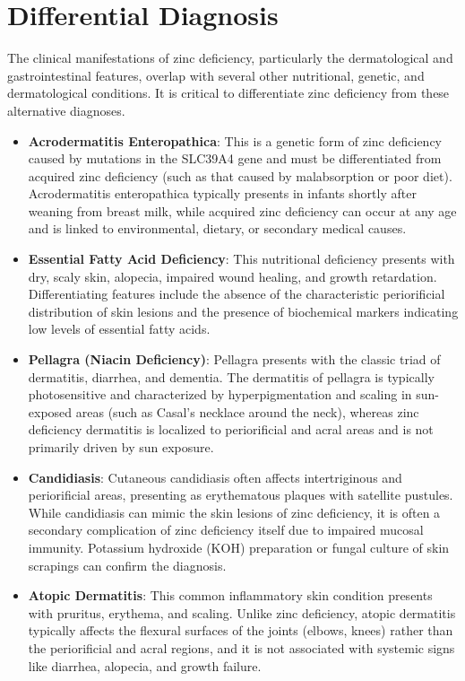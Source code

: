 \section*{Differential Diagnosis}
The clinical manifestations of zinc deficiency, particularly the dermatological and gastrointestinal features, overlap with several other nutritional, genetic, and dermatological conditions. It is critical to differentiate zinc deficiency from these alternative diagnoses.
\begin{itemize}
    \item \textbf{Acrodermatitis Enteropathica}: This is a genetic form of zinc deficiency caused by mutations in the SLC39A4 gene and must be differentiated from acquired zinc deficiency (such as that caused by malabsorption or poor diet). Acrodermatitis enteropathica typically presents in infants shortly after weaning from breast milk, while acquired zinc deficiency can occur at any age and is linked to environmental, dietary, or secondary medical causes.
    \item \textbf{Essential Fatty Acid Deficiency}: This nutritional deficiency presents with dry, scaly skin, alopecia, impaired wound healing, and growth retardation. Differentiating features include the absence of the characteristic periorificial distribution of skin lesions and the presence of biochemical markers indicating low levels of essential fatty acids.
    \item \textbf{Pellagra (Niacin Deficiency)}: Pellagra presents with the classic triad of dermatitis, diarrhea, and dementia. The dermatitis of pellagra is typically photosensitive and characterized by hyperpigmentation and scaling in sun-exposed areas (such as Casal's necklace around the neck), whereas zinc deficiency dermatitis is localized to periorificial and acral areas and is not primarily driven by sun exposure.
    \item \textbf{Candidiasis}: Cutaneous candidiasis often affects intertriginous and periorificial areas, presenting as erythematous plaques with satellite pustules. While candidiasis can mimic the skin lesions of zinc deficiency, it is often a secondary complication of zinc deficiency itself due to impaired mucosal immunity. Potassium hydroxide (KOH) preparation or fungal culture of skin scrapings can confirm the diagnosis.
    \item \textbf{Atopic Dermatitis}: This common inflammatory skin condition presents with pruritus, erythema, and scaling. Unlike zinc deficiency, atopic dermatitis typically affects the flexural surfaces of the joints (elbows, knees) rather than the periorificial and acral regions, and it is not associated with systemic signs like diarrhea, alopecia, and growth failure.

\end{itemize}
